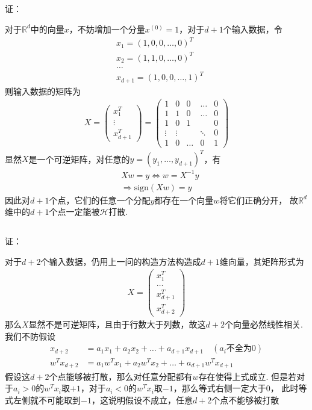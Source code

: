 \documentclass[12pt, a4paper]{article}
\begin{document}
\subsection{}

证：

对于$\mathbb{R}^d$中的向量$x$，不妨增加一个分量$x^{(0)}=1$，对于$d+1$个输入数据，令
\begin{align*}
    &x_1=(1,0,0,\dots,0)^T\\
    &x_2=(1,1,0,\dots,0)^T\\
    &\dots\\
    &x_{d+1}=(1,0,0,\dots,1)^T
\end{align*}
则输入数据的矩阵为
\begin{align*}
    X=\begin{pmatrix}
        x_1^T\\ \vdots \\ x_{d+1}^T
    \end{pmatrix}=\begin{pmatrix}
        1 & 0 & 0 & \dots & 0\\
        1 & 1 & 0 & \dots & 0\\
        1 & 0 & 1 & & 0\\
        \vdots & \vdots & & \ddots & 0 \\
        1 & 0 & \dots & 0 & 1
    \end{pmatrix}
\end{align*}
显然$X$是一个可逆矩阵，对任意的$y=(y_1,\dots,y_{d+1})^T$，有
\begin{align*}
    &Xw=y \Leftrightarrow w=X^{-1}y\\
    &\Rightarrow \text{sign}(Xw)=y
\end{align*}
因此对$d+1$个点，它们的任意一个分配$y$都存在一个向量$w$将它们正确分开，
故$\mathbb{R}^d$维中的$d+1$个点一定能被$\mathcal{H}$打散.

\subsection{}

证：

对于$d+2$个输入数据，仍用上一问的构造方法构造成$d+1$维向量，其矩阵形式为
\begin{align*}
    X=\begin{pmatrix}
        x_1^T\\
        \dots\\
        x_{d+1}^T\\
        x_{d+2}^T
    \end{pmatrix}
\end{align*}
那么$X$显然不是可逆矩阵，且由于行数大于列数，故这$d+2$个向量必然线性相关.
我们不防假设
\begin{align*}
    x_{d+2}&=a_1x_1+a_2x_2+\dots+a_{d+1}x_{d+1}  \quad   (a_i\text{不全为0})\\
    w^Tx_{d+2}&=a_1w^Tx_1+a_2w^Tx_2+\dots+a_{d+1}w^Tx_{d+1}
\end{align*}
假设这$d+2$个点能够被打散，那么对任意分配都有$w$存在使得上式成立. 
但是若对于$a_i>0$的$w^Tx_i$取$+1$，对于$a_i<0$的$w^Tx_i$取$-1$，那么等式右侧一定大于0，
此时等式左侧就不可能取到$-1$，这说明假设不成立，任意$d+2$个点不能够被打散
\end{document}

